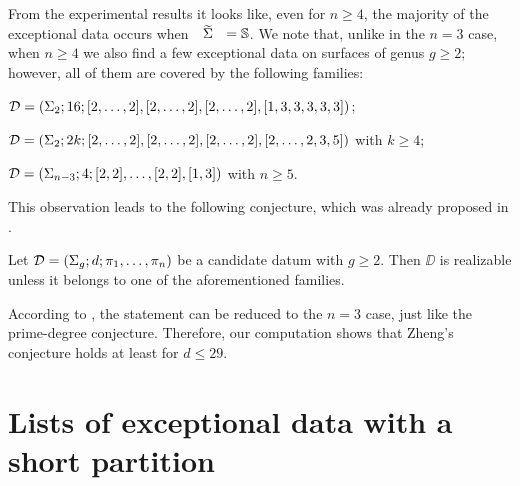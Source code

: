 \egroup

From the experimental results it looks like, even for $n\ge 4$, the majority of the exceptional data occurs when $\tSigma=\sphere$. We note that, unlike in the $n=3$ case, when $n\ge 4$ we also find a few exceptional data on surfaces of genus $g\ge 2$; however,
all of them are covered by the following families:
\begin{enumarabic}
\item $\mathcal{D}=(\Sigma_{2};16;[2,\ldots,2],[2,\ldots,2],[2,\ldots,2],[1,3,3,3,3,3])$;
\item $\mathcal{D}=(\Sigma_{2};2k;[2,\ldots,2],[2,\ldots,2],[2,\ldots,2],[2,\ldots,2,3,5])$ with $k\ge 4$;
\item $\mathcal{D}=(\Sigma_{n-3};4;[2,2],\ldots,[2,2],[1,3])$ with $n\ge 5$.
\end{enumarabic}
This observation leads to the following conjecture, which was already proposed in \cite{zheng}.
\begin{conjecture*}[Zheng]
Let $\mathcal{D}=(\Sigma_{g};d;\pi_1,\ldots,\pi_n)$ be a candidate datum with $g\ge 2$. Then $\DD$ is realizable unless it belongs to one of the aforementioned families.
\end{conjecture*}
According to \citeauthor{zheng}, the statement can be reduced to the $n=3$ case, just like the prime-degree conjecture. Therefore, our computation shows that Zheng's conjecture holds at least for $d\le 29$.

\section{Lists of exceptional data with a short partition}\label{computational-results:sc:lists}

